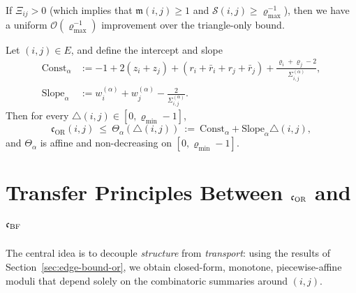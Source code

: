 \documentclass[twoside,11pt]{article}
\numberwithin{equation}{section}
\numberwithin{theorem}{section}
\numberwithin{example}{section}
\begin{document}
\begin{remark}
\label{rem:coarse-C4}
If $\Xi_{ij}>0$ (which implies that $\mathfrak m(i,j)\ge 1$ and $\mathscr S(i,j)\ge \varrho_{\max}^{-1}$), then we have a uniform $\mathcal O(\varrho_{\max}^{-1})$ improvement over the triangle-only bound.
\end{remark}


\begin{proposition}
\label{prop:coverage-envelope-monotone}
Let $(i,j)\in E$, and define the intercept and slope
\begin{equation}
\label{eq:const-slope}
\begin{aligned}
\mathrm{Const}_\alpha
&:=
-1+2(z_i+z_j)
+(r_i+\bar r_i+r_j+\bar r_j)
+\frac{\varrho_i+\varrho_j-2}{\Sigma^{(\alpha)}_{i,j}},
\\
\mathrm{Slope}_\alpha
&:=w^{(\alpha)}_i+w^{(\alpha)}_j-\frac{2}{\Sigma^{(\alpha)}_{i,j}}.
\end{aligned}
\end{equation}
Then for every $\triangle(i,j)\in[0,\varrho_{\min}-1]$,
\begin{equation}
\label{eq:Theta-alpha-def}
\mathfrak c_{\mathrm{OR}}(i,j)\ \le\ 
\Theta_\alpha(\triangle(i,j))\ :=\ \mathrm{Const}_\alpha+\mathrm{Slope}_\alpha\triangle(i,j),
\end{equation}
and $\Theta_\alpha$ is affine and non-decreasing on $[0,\varrho_{\min}-1]$.
\end{proposition}


\section{Transfer Principles Between \texorpdfstring{$\mathfrak c_{\rm OR}$}{cOR} and \texorpdfstring{$\mathfrak c_{\rm BF}$}{cBF}}
\label{sec:transfer-curvatures}
The central idea is to decouple \emph{structure} from \emph{transport}: using the results of Section~\ref{sec:edge-bound-or}, we obtain closed-form, monotone, piecewise-affine moduli that depend solely on the combinatoric summaries around \((i,j)\).
\end{document}
